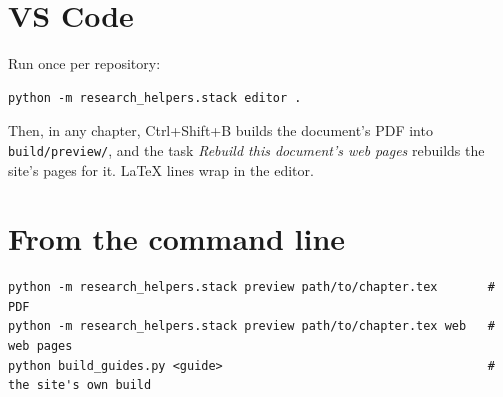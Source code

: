 \section{VS Code}

Run once per repository:
\begin{lstlisting}
python -m research_helpers.stack editor .
\end{lstlisting}
Then, in any chapter, Ctrl+Shift+B builds the document's PDF into \texttt{build/preview/}, and the task \emph{Rebuild this document's web pages} rebuilds the site's pages for it. LaTeX lines wrap in the editor.

\section{From the command line}

\begin{lstlisting}
python -m research_helpers.stack preview path/to/chapter.tex       # PDF
python -m research_helpers.stack preview path/to/chapter.tex web   # web pages
python build_guides.py <guide>                                     # the site's own build
\end{lstlisting}
